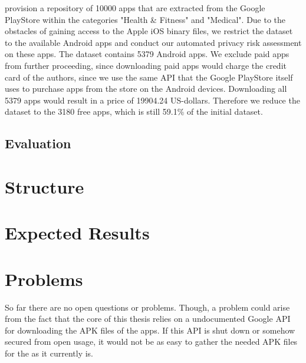 \documentclass[
	a4paper,
	oneside,
	12pt,
	liststotocnumbered
]{article}
\let\cite\textcite
\begin{document}
\cite{Xu2015} provision a repository of 10000 apps that are extracted from the Google PlayStore within the categories "Health \& Fitness" and "Medical".
Due to the obstacles of gaining access to the Apple iOS binary files, we restrict the dataset to the available Android apps and conduct our automated privacy risk assessment on these apps.
The \cite{Xu2015} dataset contains 5379 Android apps. 
We exclude paid apps from further proceeding, since downloading paid apps would charge the credit card of the authors, since we use the same \acs{API} that the Google PlayStore itself uses to purchase apps from the store on the Android devices. 
Downloading all 5379 apps would result in a price of 19904.24 US-dollars. 
Therefore we reduce the dataset to the 3180 free apps, which is still 59.1\% of the  initial dataset.

\subsection{Evaluation}

\section{Structure}

\section{Expected Results}

\section{Problems}
So far there are no open questions or problems. Though, a problem could arise from the fact that the core of this thesis relies on a undocumented Google \acs{API} for downloading the \acs{APK} files of the apps. 
If this \acs{API} is shut down or somehow secured from open usage, it would not be as easy to gather the needed \acs{APK} files for the \sca as it currently is.

\newpage
\printbibliography[title={References}]
\end{document}
